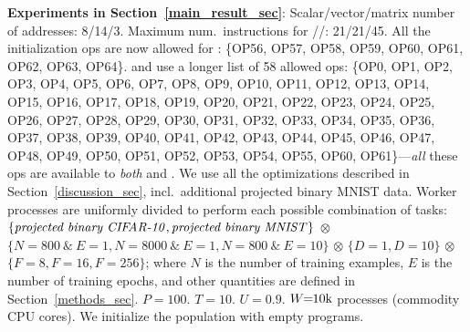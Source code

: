 {\textbf{Experiments in Section~\ref{main_result_sec}}: Scalar/vector/matrix number of addresses: 8/14/3. Maximum num.\ instructions for \setup/\predict/\learn: 21/21/45. All the initialization ops are now allowed for \setup: \{OP56, OP57, OP58, OP59, OP60, OP61, OP62, OP63, OP64\}. \predict and \learn use a longer list of 58 allowed ops: \{OP0, OP1, OP2, OP3, OP4, OP5, OP6, OP7, OP8, OP9, OP10, OP11, OP12, OP13, OP14, OP15, OP16, OP17, OP18, OP19, OP20, OP21, OP22, OP23, OP24, OP25, OP26, OP27, OP28, OP29, OP30, OP31, OP32, OP33, OP34, OP35, OP36, OP37, OP38, OP39, OP40, OP41, OP42, OP43, OP44, OP45, OP46, OP47, OP48, OP49, OP50, OP51, OP52, OP53, OP54, OP55, OP60, OP61\}---\emph{all} these ops are available to \emph{both} \predict and \learn. We use all the optimizations described in Section~\ref{discussion_sec}, incl.\ additional projected binary MNIST data. Worker processes are uniformly divided to perform each possible combination of tasks: $\{\textrm{\textit{projected binary CIFAR-10}}, \textrm{\textit{projected binary MNIST}}\}$ $\otimes$ $\{N\!\!=\!\!800\ \&\ E\!\!=\!\!1, N\!\!=\!\!8000\ \&\ E\!\!=\!\!1, N\!\!=\!\!800\ \&\ E\!\!=\!\!10\}$ $\otimes$ $\{D\!\!=\!\!1, D\!\!=\!\!10\}$ $\otimes$ $\{F\!\!=\!\!8, F\!\!=\!\!16, F\!\!=\!\!256\}$; where $N$ is the number of training examples, $E$ is the number of training epochs, and other quantities are defined in Section~\ref{methods_sec}. $P\!\!=\!\!100$. $T\!\!=\!\!10$. $U\!\!=\!\!0.9$. $W\!\!=\!\!10\textrm{\normalfont{k}}$ processes (commodity CPU cores). We initialize the population with empty programs.

}
